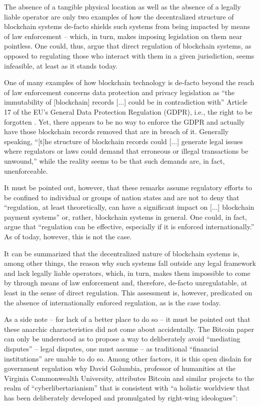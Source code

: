 The absence of a tangible physical location as well as the absence of a legally liable operator are only two examples of how the decentralized structure of blockchain systems de-facto shields such systems from being impacted by means of law enforcement -- which, in turn, makes imposing legislation on them near pointless.
One could, thus, argue that direct regulation of blockchain systems, as opposed to regulating those who interact with them in a given jurisdiction, seems infeasible, at least as it stands today.

One of many examples of how blockchain technology is de-facto beyond the reach of law enforcement concerns data protection and privacy legislation as ``the immutability of [blockchain] records [...] could be in contradiction with'' Article 17 of the EU's General Data Protection Regulation (GDPR), i.e., the right to be forgotten \autocite[35]{esma2017}.
Yet, there appears to be no way to enforce the GDPR and actually have those blockchain records removed that are in breach of it.
Generally speaking, ``[t]he structure of blockchain records could [...] generate legal issues where regulators or laws could demand that erroneous or illegal transactions be unwound,'' \autocite[7]{yeoh2017} while the reality seems to be that such demands are, in fact, unenforceable.

It must be pointed out, however, that these remarks assume regulatory efforts to be confined to individual or groups of nation states and are not to deny that ``regulation, at least theoretically, can have a significant impact on [...] blockchain payment systems'' or, rather, blockchain systems in general.
One could, in fact, argue that ``regulation can be effective, especially if it is enforced internationally.'' \autocite[2]{shanaev2019}
As of today, however, this is not the case. 

It can be summarized that the decentralized nature of blockchain systems is, among other things, the reason why such systems fall outside any legal framework and lack legally liable operators, which, in turn, makes them impossible to come by through means of law enforcement and, therefore, de-facto unregulatable, at least in the sense of direct regulation.
This assessment is, however, predicated on the absence of internationally enforced regulation, as is the case today.

As a side note -- for lack of a better place to do so -- it must be pointed out that these anarchic characteristics did not come about accidentally.
The Bitcoin paper can only be understood as to propose a way to deliberately avoid ``mediating disputes'' -- legal disputes, one must assume -- as traditional ``financial institutions'' are unable to do so. \autocite[1]{bitcoin2008paper}
Among other factors, it is this open disdain for government regulation why David Golumbia, professor of humanities at the Virginia Commonwealth University, attributes Bitcoin and similar projects to the realm of ``cyberlibertarianism'' that is consistent with ``a holistic worldview that has been deliberately developed and promulgated by right-wing ideologues'': \autocite[5, 6]{golumbia2016}

